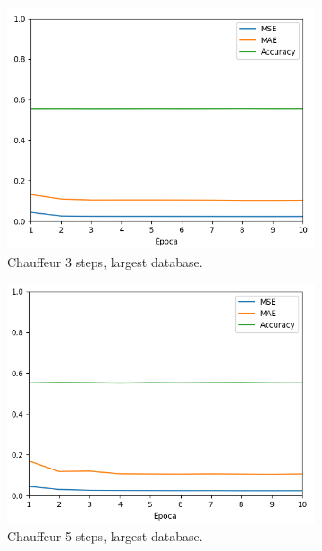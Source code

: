\documentclass[conference]{IEEEtran}
\begin{document}
\begin{figure}[h]
\begin{subfigure}{0.24\textwidth}
		\includegraphics[width=\textwidth]{img/chauffeur3}
		\caption{Chauffeur 3 steps, largest database.} 
		\label{subfig:3}
	\end{subfigure}
	\begin{subfigure}{0.24\textwidth} 
		\includegraphics[width=\textwidth]{img/chauffeur5}
		\caption{Chauffeur 5 steps, largest database.} 
		\label{subfig:4}
	\end{subfigure}
	\begin{subfigure}{0.24\textwidth} 

\end{subfigure}
\end{figure}
\end{document}

